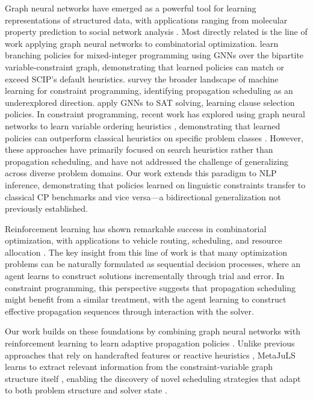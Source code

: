 \documentclass[11pt]{article}
\begin{document}
Graph neural networks have emerged as a powerful tool for learning representations of structured data, with applications ranging from molecular property prediction to social network analysis \citep{kipf2017semi,hamilton2017inductive,perozzi2014deepwalk,vaswani2017attention}. Most directly related is the line of work applying graph neural networks to combinatorial optimization. \citet{gasse2019exact} learn branching policies for mixed-integer programming using GNNs over the bipartite variable-constraint graph, demonstrating that learned policies can match or exceed SCIP's default heuristics. \citet{cappart2021combinatorial} survey the broader landscape of machine learning for constraint programming, identifying propagation scheduling as an underexplored direction. \citet{nair2020solving} apply GNNs to SAT solving, learning clause selection policies. In constraint programming, recent work has explored using graph neural networks to learn variable ordering heuristics \citep{velickovic2018graph}, demonstrating that learned policies can outperform classical heuristics on specific problem classes \citep{gent2006watched}. However, these approaches have primarily focused on search heuristics rather than propagation scheduling, and have not addressed the challenge of generalizing across diverse problem domains. Our work extends this paradigm to NLP inference, demonstrating that policies learned on linguistic constraints transfer to classical CP benchmarks and vice versa---a bidirectional generalization not previously established.

Reinforcement learning has shown remarkable success in combinatorial optimization, with applications to vehicle routing, scheduling, and resource allocation \citep{sutton2018reinforcement,schulman2017proximal,freund1997decision}. The key insight from this line of work is that many optimization problems can be naturally formulated as sequential decision processes, where an agent learns to construct solutions incrementally through trial and error. In constraint programming, this perspective suggests that propagation scheduling might benefit from a similar treatment, with the agent learning to construct effective propagation sequences through interaction with the solver.

Our work builds on these foundations by combining graph neural networks with reinforcement learning to learn adaptive propagation policies \citep{velickovic2018graph,schulman2017proximal}. Unlike previous approaches that rely on handcrafted features or reactive heuristics \citep{wallace1996practical,marques2012activity}, MetaJuLS learns to extract relevant information from the constraint-variable graph structure itself \citep{kipf2017semi,hamilton2017inductive}, enabling the discovery of novel scheduling strategies that adapt to both problem structure and solver state \citep{bessiere2006constraint}.
\end{document}
